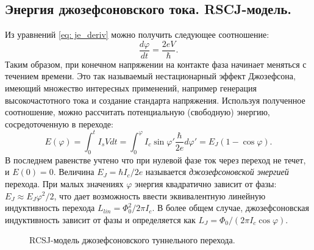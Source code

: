 \subsection{Энергия джозефсоновского тока. RSCJ-модель.}
Из уравнений \eqref{eq: je_deriv} можно получить следующее соотношение:
\begin{equation}
\frac{d\varphi}{dt} = \frac{2eV}{\hbar}.
\label{eq: dphidt}
\end{equation}
Таким образом, при конечном напряжении на контакте фаза начинает меняться с течением времени. Это так называемый нестационарный эффект Джозефсона, имеющий множество интересных применений, например генерация высокочастотного тока и создание стандарта напряжения. Используя полученное соотношение, можно рассчитать потенциальную (свободную) энергию, сосредоточенную в переходе:
\begin{equation}
\label{eq:EJ}  
E(\varphi) = \int_{0}^{t}I_sVdt = \int_{0}^{\varphi} I_c\sin \varphi' \frac{\hbar}{2e} {d\varphi'} = E_J(1-\cos\varphi).
\end{equation}
В последнем равенстве учтено что при нулевой фазе ток через переход не течет, и $E(0)=0$. Величина $E_J = {\hbar I_c}/{2e}$ называется \textit{джозефсоновской энергией} перехода. При малых значениях $\varphi$ энергия квадратично зависит от фазы: $E_J\approx E_J \varphi^2/2$, что дает возможность ввести эквивалентную линейную индуктивность перехода $L_{lin} = \Phi_0^2/2\pi I_c$. В более общем случае, джозефсоновская индуктивность зависит от фазы и определяется как $L_J = \Phi_0/(2\pi I_c \cos \varphi)$.
\begin{figure}[ht]
	{\centering
		\hfill
		\label{img:RCSJ}
		\hfill
		\def\svgwidth{2.2in}
		\label{fig: washboard}
		\hfill
	}
	\caption{RCSJ-модель джозефсоновского туннельного перехода.}
	\label{img:knuth_2}
\end{figure}

